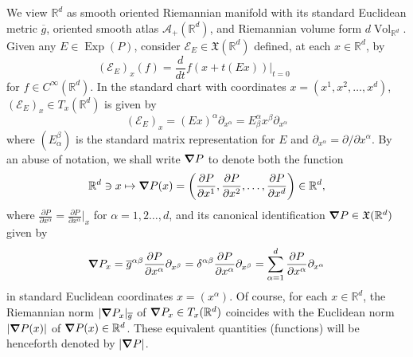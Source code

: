 \documentclass[smallextended]{svjour3}
\theoremstyle{remark}
\newcommand\Exp{\operatorname{Exp}}
\newcommand{\Vol}{\operatorname{Vol}}
\begin{document}
\noindent We view $\mathbb{R}^d$ as smooth oriented Riemannian manifold with its standard Euclidean metric $\overline{g}$, oriented smooth atlas $\mathcal{A}_+(\mathbb{R}^d)$, and Riemannian volume form $ d\Vol_{\mathbb{R}^d}$. Given any $E\in\Exp(P)$, consider $\mathcal{E}_E\in \mathfrak{X}(\mathbb{R}^d)$ defined, at each $x\in\mathbb{R}^d$, by
\begin{equation*}
    (\mathcal{E}_E)_x(f)=\frac{d}{dt}f(x+t(Ex))\big\vert_{t=0}\hspace{1cm}
\end{equation*}
for $f\in C^\infty(\mathbb{R}^d)$. In the standard chart with coordinates $x=(x^1,x^2,\dots,x^d)$, $(\mathcal{E}_E)_{x}\in T_{x}(\mathbb{R}^d)$ is given by
\begin{equation*}
    (\mathcal{E}_E)_{x}=(Ex)^{\alpha}\partial_{x^\alpha}=E^\alpha_\beta x^{\beta}\partial_{x^\alpha}
\end{equation*}
where $(E_\alpha^\beta)$ is the standard matrix representation for $E$ and  $\partial_{x^{\alpha}}=\partial/\partial x^\alpha$. By an abuse of notation, we shall write $\grad P$ to denote both the function
\begin{equation*}
\mathbb{R}^d\ni x\mapsto \grad P(x)=\left(\frac{\partial P}{\partial x^1},\frac{\partial P}{\partial x^2},\dots,\frac{\partial P}{\partial x^d}\right)\in\mathbb{R}^d,
\end{equation*}
where $\frac{\partial P}{\partial x^{\alpha}}=\frac{\partial P}{\partial x^{\alpha}}\vert_{x}$ for $\alpha=1,2\dots,d$, and its canonical identification $\grad P\in \mathfrak{X}(\mathbb{R}^d)$ given by \begin{equation*}
    \grad P_x=\overline{g}^{\alpha\beta}\frac{\partial P}{\partial x^{\alpha}}\partial_{x^{\beta}}=\delta^{\alpha\beta}\frac{\partial P}{\partial x^{\alpha}}\partial_{x^{\beta}}=\sum_{\alpha=1}^d\frac{\partial P}{\partial x^{\alpha}}\partial_{x^\alpha}
\end{equation*}
in standard Euclidean coordinates $x=(x^\alpha)$. Of course, for each $x\in\mathbb{R}^d$, the Riemannian norm $|\grad P_x |_{\overline{g}}$ of $\grad P_x \in T_x (\mathbb{R}^d)$ coincides with the Euclidean norm $| \grad P(x) |$ of $ \grad P(x) \in \mathbb{R}^d$. These equivalent quantities (functions) will be henceforth denoted by $|\grad P|$.
\end{document}
